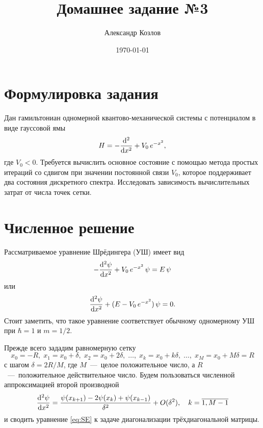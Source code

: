 \documentclass[10pt]{article}
\title{Домашнее задание №3}
\author{Александр Козлов}
\date{\today}
\begin{document}
\maketitle

\section*{Формулировка задания}

Дан гамильтониан одномерной квантово-механической системы с потенциалом в виде гауссовой ямы
\begin{equation}
    H = - \dv[2]{}{x} + V_0\, e^{-x^2},
\end{equation}
где $V_0 < 0$. Требуется вычислить основное состояние с помощью метода простых итераций со сдвигом при значении постоянной связи $V_0$, которое поддерживает два состояния дискретного спектра. Исследовать зависимость вычислительных затрат от числа точек сетки.

\section{Численное решение}

Рассматриваемое уравнение Шрёдингера (УШ) имеет вид
\begin{equation}
    -\dv[2]{\psi}{x} + V_0\, e^{-x^2}\, \psi  = E\, \psi
    \label{eq:SE}
\end{equation}
или
\begin{equation}
    \dv[2]{\psi}{x}  + (E - V_0\, e^{-x^2})\, \psi  = 0.
\end{equation}
Стоит заметить, что такое уравнение соответствует обычному одномерному УШ при $\hbar=1$ и $m=1/2$.

Прежде всего зададим равномерную сетку
\begin{equation}
    x_0 = -R,\; x_1 = x_0 + \delta,\; x_2 = x_0 + 2\delta,\; \ldots,\; x_k = x_0 + k\delta,\; \ldots,\; x_M = x_0 + M \delta = R
\end{equation}
с шагом $\delta = 2R/M$, где $M$~---~целое положительное число, а $R$~---~положительное действительное число. Будем пользоваться численной аппроксимацией второй производной
\begin{equation}
    \dv[2]{\psi}{x}(x_k) = \dfrac{\psi(x_{k+1}) - 2\psi(x_{k}) + \psi(x_{k-1})}{\delta^2} + O(\delta^2),\quad k = \overline{1,M-1}
\end{equation}
и сводить уравнение \eqref{eq:SE} к задаче диагонализации трёхдиагональной матрицы.
\end{document}
